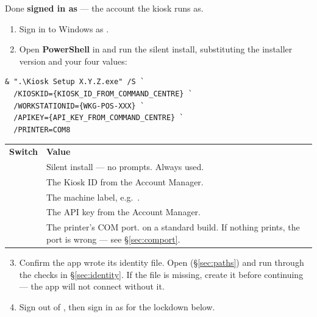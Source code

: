 \documentclass[a4paper,10pt]{article}
\begin{document}
Done \textbf{signed in as } --- the account the kiosk
runs as.

\begin{enumerate}
  \item Sign in to Windows as .

  \item Open \textbf{PowerShell} in
        and run the silent install, substituting the installer version and
        your four values:
\end{enumerate}

\begin{lstlisting}
& ".\Kiosk Setup X.Y.Z.exe" /S `
  /KIOSKID={KIOSK_ID_FROM_COMMAND_CENTRE} `
  /WORKSTATIONID={WKG-POS-XXX} `
  /APIKEY={API_KEY_FROM_COMMAND_CENTRE} `
  /PRINTER=COM8
\end{lstlisting}

\begin{center}
\renewcommand{\arraystretch}{1.3}\small
\begin{tabularx}{\textwidth}{L{34mm} X}
\color{white}\textbf{Switch} &
\color{white}\textbf{Value}\\
 & Silent install --- no prompts. Always used.\\
 & The Kiosk ID from the Account Manager.\\
 & The machine label, e.g.\ .\\
 & The API key from the Account Manager.\\
 & The printer's COM port.  on a standard
build. If nothing prints, the port is wrong --- see
\S\ref{sec:comport}.\\
\end{tabularx}
\end{center}

\begin{enumerate}\setcounter{enumi}{2}
  \item Confirm the app wrote its identity file. Open
         (\S\ref{sec:paths}) and run through the
        checks in \S\ref{sec:identity}. If the file is missing, create it
        before continuing --- the app will not connect without it.

  \item Sign out of , then sign in as 
        for the lockdown below.
\end{enumerate}
\end{document}
